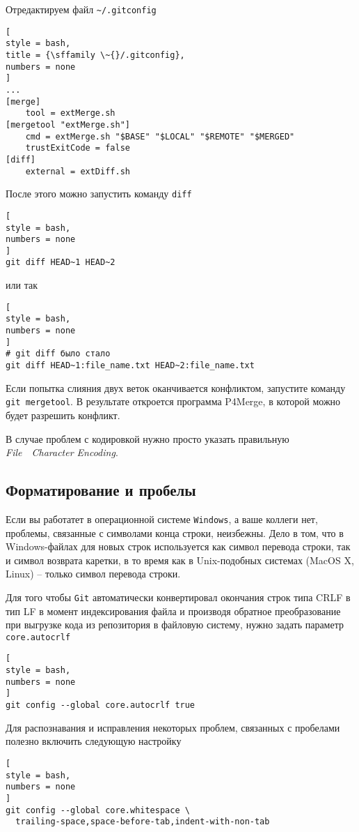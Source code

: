 \documentclass[%
	11pt,
	a4paper,
	utf8,
		]{article}
\begin{document}
Отредактируем файл \verb|~/.gitconfig|
\begin{lstlisting}[
style = bash,
title = {\sffamily \~{}/.gitconfig},
numbers = none
]
...
[merge]
    tool = extMerge.sh
[mergetool "extMerge.sh"]
    cmd = extMerge.sh "$BASE" "$LOCAL" "$REMOTE" "$MERGED"
    trustExitCode = false
[diff]
    external = extDiff.sh
\end{lstlisting}

После этого можно запустить команду \texttt{diff} 
\begin{lstlisting}[
style = bash,
numbers = none
]
git diff HEAD~1 HEAD~2
\end{lstlisting}
или так 
\begin{lstlisting}[
style = bash,
numbers = none
]
# git diff было стало
git diff HEAD~1:file_name.txt HEAD~2:file_name.txt
\end{lstlisting}

Если попытка слияния двух веток оканчивается конфликтом, запустите команду \texttt{git mergetool}. В результате откроется программа P4Merge, в которой можно будет разрешить конфликт.

В случае проблем с кодировкой нужно просто указать правильную \textit{File}~\textrightarrow~\textit{Character Encoding}.


\subsection{Форматирование и пробелы}

Если вы работатет в операционной системе \texttt{Windows}, а ваше коллеги нет, проблемы, связанные с символами конца строки, неизбежны. Дело в том, что в Windows-файлах для новых строк используется как символ перевода строки, так и символ возврата каретки, в то время как в Unix-подобных системах (MacOS X, Linux) -- только символ перевода строки.

Для того чтобы \texttt{Git} автоматически конвертировал окончания строк типа CRLF в тип LF в момент индексирования файла и производя обратное преобразование при выгрузке кода из репозитория в файловую систему, нужно задать параметр \texttt{core.autocrlf}
\begin{lstlisting}[
style = bash,
numbers = none
]
git config --global core.autocrlf true
\end{lstlisting}

Для распознавания и исправления некоторых проблем, связанных с пробелами полезно
включить следующую настройку
\begin{lstlisting}[
style = bash,
numbers = none
]
git config --global core.whitespace \
  trailing-space,space-before-tab,indent-with-non-tab
\end{lstlisting}
\end{document}
